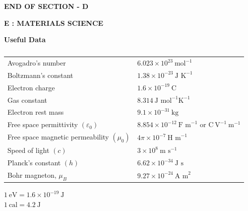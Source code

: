 \documentclass[12pt]{article}
\begin{document}
\begin{center}
    \textbf{END OF SECTION - D}
\end{center}

\newpage

\begin{center}
    \textbf{\Large E : MATERIALS SCIENCE}
\end{center}

\textbf{Useful Data}

   \begin{table}[H]     \centering     \caption{}     \label{}     \begin{tabular}{ll}
Avogadro's number & $6.023 \times 10^{23} \ \text{mol}^{-1}$ \\
Boltzmann's constant & $1.38 \times 10^{-23} \ \text{J K}^{-1}$ \\
Electron charge & $1.6 \times 10^{-19} \ \text{C}$ \\
Gas constant & $8.314 \ \text{J mol}^{-1} \text{K}^{-1}$ \\
Electron rest mass & $9.1 \times 10^{-31} \ \text{kg}$ \\
Free space permittivity $(\varepsilon_0)$ & $8.854 \times 10^{-12} \ \text{F m}^{-1}$ or $\text{C} \ \text{V}^{-1} \ \text{m}^{-1}$ \\
Free space magnetic permeability $(\mu_0)$ & $4\pi \times 10^{-7} \ \text{H m}^{-1}$ \\
Speed of light $(c)$ & $3 \times 10^{8} \ \text{m s}^{-1}$ \\
Planck's constant $(h)$ & $6.62 \times 10^{-34} \ \text{J s}$ \\
Bohr magneton, $\mu_B$ & $9.27 \times 10^{-24} \ \text{A m}^2$ \\
\end{tabular} \end{table}


$1 \ \text{eV} = 1.6 \times 10^{-19} \ \text{J}$ \\
$1 \ \text{cal} = 4.2 \ \text{J}$
\end{document}
